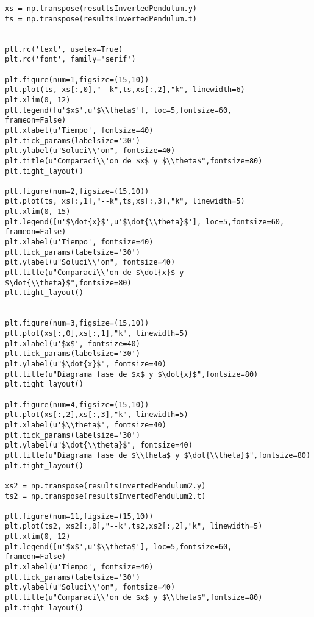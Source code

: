 \documentclass[12pt,letterpaper]{article}
\begin{document}
\begin{verbatim}
xs = np.transpose(resultsInvertedPendulum.y)
ts = np.transpose(resultsInvertedPendulum.t)


plt.rc('text', usetex=True)
plt.rc('font', family='serif')

plt.figure(num=1,figsize=(15,10))
plt.plot(ts, xs[:,0],"--k",ts,xs[:,2],"k", linewidth=6)
plt.xlim(0, 12)
plt.legend([u'$x$',u'$\\theta$'], loc=5,fontsize=60,
frameon=False)
plt.xlabel(u'Tiempo', fontsize=40)
plt.tick_params(labelsize='30')
plt.ylabel(u"Soluci\\'on", fontsize=40)
plt.title(u"Comparaci\\'on de $x$ y $\\theta$",fontsize=80)
plt.tight_layout()

plt.figure(num=2,figsize=(15,10))
plt.plot(ts, xs[:,1],"--k",ts,xs[:,3],"k", linewidth=5)
plt.xlim(0, 15)
plt.legend([u'$\dot{x}$',u'$\dot{\\theta}$'], loc=5,fontsize=60,
frameon=False)
plt.xlabel(u'Tiempo', fontsize=40)
plt.tick_params(labelsize='30')
plt.ylabel(u"Soluci\\'on", fontsize=40)
plt.title(u"Comparaci\\'on de $\dot{x}$ y $\dot{\\theta}$",fontsize=80)
plt.tight_layout()
    
    
plt.figure(num=3,figsize=(15,10))
plt.plot(xs[:,0],xs[:,1],"k", linewidth=5)
plt.xlabel(u'$x$', fontsize=40)
plt.tick_params(labelsize='30')
plt.ylabel(u"$\dot{x}$", fontsize=40)
plt.title(u"Diagrama fase de $x$ y $\dot{x}$",fontsize=80)
plt.tight_layout()

plt.figure(num=4,figsize=(15,10))
plt.plot(xs[:,2],xs[:,3],"k", linewidth=5)
plt.xlabel(u'$\\theta$', fontsize=40)
plt.tick_params(labelsize='30')
plt.ylabel(u"$\dot{\\theta}$", fontsize=40)
plt.title(u"Diagrama fase de $\\theta$ y $\dot{\\theta}$",fontsize=80)
plt.tight_layout()  

xs2 = np.transpose(resultsInvertedPendulum2.y)
ts2 = np.transpose(resultsInvertedPendulum2.t)

plt.figure(num=11,figsize=(15,10))
plt.plot(ts2, xs2[:,0],"--k",ts2,xs2[:,2],"k", linewidth=5)
plt.xlim(0, 12)
plt.legend([u'$x$',u'$\\theta$'], loc=5,fontsize=60,
frameon=False)
plt.xlabel(u'Tiempo', fontsize=40)
plt.tick_params(labelsize='30')
plt.ylabel(u"Soluci\\'on", fontsize=40)
plt.title(u"Comparaci\\'on de $x$ y $\\theta$",fontsize=80)
plt.tight_layout()


\end{verbatim}
\end{document}
